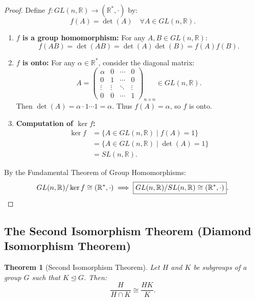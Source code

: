\documentclass[12pt]{article}
\theoremstyle{definition}
\theoremstyle{plain}
\newtheorem{theorem}{Theorem}[section]
\begin{document}
\begin{proof}
Define $f: GL(n, \mathbb{R}) \to (\mathbb{R}^*, \cdot)$ by:
\[
f(A) = \det(A) \quad \forall A \in GL(n, \mathbb{R}).
\]
\begin{enumerate}
    \item \textbf{$f$ is a group homomorphism:}
    For any $A, B \in GL(n, \mathbb{R})$:
    \[
    f(AB) = \det(AB) = \det(A) \det(B) = f(A) f(B).
    \]
    
    \item \textbf{$f$ is onto:}
    For any $\alpha \in \mathbb{R}^*$, consider the diagonal matrix:
    \[
    A = \begin{pmatrix}
    \alpha & 0 & \cdots & 0 \\
    0 & 1 & \cdots & 0 \\
    \vdots & \vdots & \ddots & \vdots \\
    0 & 0 & \cdots & 1
    \end{pmatrix}_{n \times n} \in GL(n, \mathbb{R}).
    \]
    Then $\det(A) = \alpha \cdot 1 \cdots 1 = \alpha$.
    Thus $f(A) = \alpha$, so $f$ is onto.
    
    \item \textbf{Computation of $\ker f$:}
    \begin{align*}
    \ker f &= \{ A \in GL(n, \mathbb{R}) \mid f(A) = 1 \} \\
    &= \{ A \in GL(n, \mathbb{R}) \mid \det(A) = 1 \} \\
    &= SL(n, \mathbb{R}).
    \end{align*}
\end{enumerate}
By the Fundamental Theorem of Group Homomorphisms:
\[
GL(n, \mathbb{R})/\ker f \cong (\mathbb{R}^*, \cdot) \implies \boxed{GL(n, \mathbb{R})/SL(n, \mathbb{R}) \cong (\mathbb{R}^*, \cdot)}. \qedhere
\]
\end{proof}

\subsection{The Second Isomorphism Theorem (Diamond Isomorphism Theorem)}

\begin{theorem}[Second Isomorphism Theorem]
Let $H$ and $K$ be subgroups of a group $G$ such that $K \trianglelefteq G$. Then:
\[
\frac{H}{H \cap K} \cong \frac{HK}{K}.
\]
\end{theorem}
\end{document}
